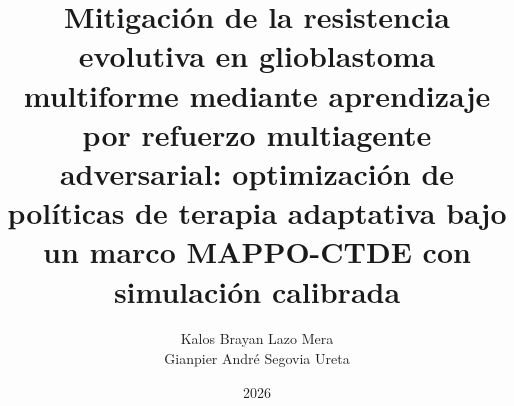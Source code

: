 \documentclass[a4paper,12pt,oneside]{tesisutec}
\begin{document}
\frontmatter

\title{Mitigación de la resistencia evolutiva en glioblastoma multiforme mediante aprendizaje por refuerzo multiagente adversarial: optimización de políticas de terapia adaptativa bajo un marco MAPPO-CTDE con simulación calibrada}
\author{Kalos Brayan Lazo Mera  \\ Gianpier André Segovia Ureta }
\date{2026}

\maketitle






\tableofcontents

\newpage

\listoftables

\newpage

\listoffigures


\mainmatter
\pagestyle{fancy}


 






\renewcommand{\bibname}{\hfill\Large\bf{REFERENCIAS BIBLIOGRÁFICAS}\hfill}




\end{document}
